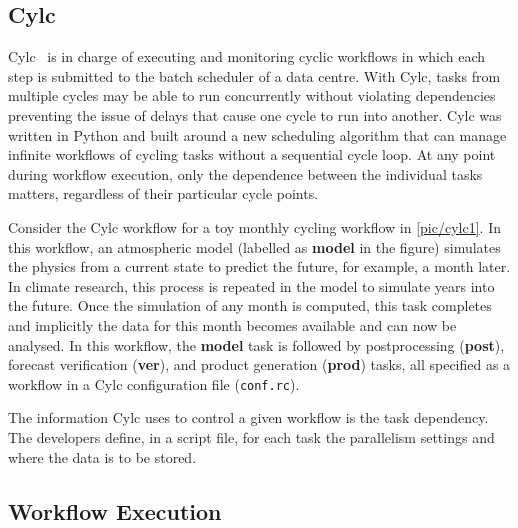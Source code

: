 \documentclass{superfri}
\begin{document}
\subsection{Cylc}

Cylc~\cite{8675433} is in charge of executing and monitoring cyclic workflows in which each step is submitted to the batch scheduler of a data centre.
With Cylc, tasks from multiple cycles may be able to run concurrently without violating dependencies preventing the issue of delays that cause one cycle to run into another.
Cylc was written in Python and built around a new scheduling algorithm that can manage infinite workflows of cycling tasks without a sequential cycle loop.
At any point during workflow execution, only the dependence between the individual tasks matters, regardless of their particular cycle points.

Consider the Cylc workflow for a toy monthly cycling workflow in \cref{pic/cylc1}.
In this workflow, an atmospheric model (labelled as \textbf{model} in the figure) simulates the physics from a current state to predict the future, for example, a month later.
In climate research, this process is repeated in the model to simulate years into the future.
Once the simulation of any month is computed, this task completes and implicitly the data for this month becomes available and can now be analysed.
In this workflow, the \textbf{model} task is followed by postprocessing (\textbf{post}), forecast verification (\textbf{ver}), and product generation (\textbf{prod}) tasks, all specified as a workflow in a Cylc configuration file (\texttt{conf.rc}).


The information Cylc uses to control a given workflow is the task dependency.
The developers define, in a script file, for each task the parallelism settings and where the data is to be stored.

\subsection{Workflow Execution}
\end{document}
